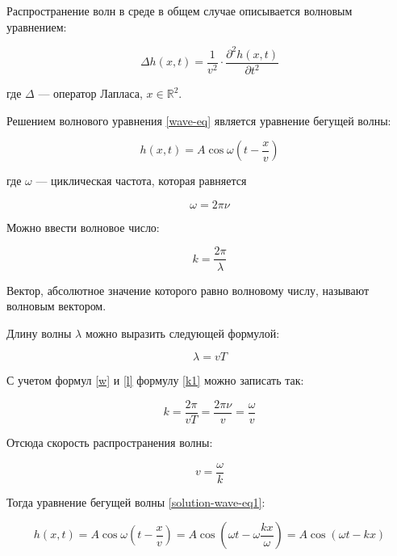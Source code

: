 Распространение волн в среде \cite{airy} в общем случае описывается волновым уравнением:

\begin{equation}
    \label{wave-eq}
    \Delta h(x,t) = \frac{1}{v^2} \cdot \frac{\partial ^2h(x,t)}{\partial t^2}
\end{equation}

где $\Delta$ --- оператор Лапласа, $x \in \mathbb{R}^2$. 

Решением волнового уравнения \ref{wave-eq} является уравнение бегущей волны:

\begin{equation}
    \label{solution-wave-eq1}
    h(x,t) = A \cos \omega (t - \frac{x}{v})
\end{equation}

где $\omega$ --- циклическая частота, которая равняется

\begin{equation}
    \label{w}
    \omega = 2\pi \nu
\end{equation}

Можно ввести волновое число:

\begin{equation}
    \label{k1}
    k = \frac{2\pi}{\lambda}
\end{equation}

Вектор, абсолютное значение которого равно волновому числу, называют волновым вектором.

Длину волны $\lambda$ можно выразить следующей формулой:

\begin{equation}
    \label{l}
    \lambda = vT
\end{equation}

С учетом формул \ref{w} и \ref{l} формулу \ref{k1} можно записать так:

\begin{equation}
    \label{k2}
    k = \frac{2\pi}{vT} = \frac{2\pi \nu}{v} = \frac{\omega}{v}
\end{equation}

Отсюда скорость распространения волны:

\begin{equation}
    \label{speed}
    v = \frac{\omega}{k}
\end{equation}

Тогда уравнение бегущей волны \ref{solution-wave-eq1}:

\begin{equation}
    \label{solution-wave-eq2}
    h(x,t) = A \cos \omega (t - \frac{x}{v}) = A \cos (\omega t - \omega \frac{kx}{\omega}) = A \cos (\omega t - kx)
\end{equation}

